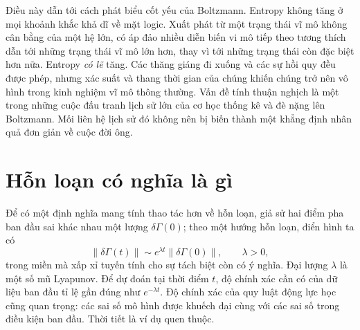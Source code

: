 \begin{classroomqa}
\end{classroomqa}

\begin{classroomqa}
\end{classroomqa}

Điều này dẫn tới cách phát biểu cốt yếu của Boltzmann. Entropy không tăng ở mọi khoảnh khắc khả dĩ về mặt logic. Xuất phát từ một trạng thái vĩ mô không cân bằng của một hệ lớn, có áp đảo nhiều diễn biến vi mô tiếp theo tương thích dẫn tới những trạng thái vĩ mô lớn hơn, thay vì tới những trạng thái còn đặc biệt hơn nữa. Entropy \emph{có lẽ} tăng. Các thăng giáng đi xuống và các sự hồi quy đều được phép, nhưng xác suất và thang thời gian của chúng khiến chúng trở nên vô hình trong kinh nghiệm vĩ mô thông thường. Vấn đề tính thuận nghịch là một trong những cuộc đấu tranh lịch sử lớn của cơ học thống kê và đè nặng lên Boltzmann. Mối liên hệ lịch sử đó không nên bị biến thành một khẳng định nhân quả đơn giản về cuộc đời ông.

\section{Hỗn loạn có nghĩa là gì}

Để có một định nghĩa mang tính thao tác hơn về hỗn loạn, giả sử hai điểm pha ban đầu sai khác nhau một lượng \(\delta\Gamma(0)\); theo một hướng hỗn loạn, điển hình ta có
\begin{equation}
 \lVert\delta\Gamma(t)\rVert
 \sim e^{\lambda t}\lVert\delta\Gamma(0)\rVert,
 \qquad \lambda>0,
 \label{eq:sm7-lyapunov-growth}
\end{equation}
trong miền mà xấp xỉ tuyến tính cho sự tách biệt còn có ý nghĩa. Đại lượng \(\lambda\) là một số mũ Lyapunov. Để dự đoán tại thời điểm \(t\), độ chính xác cần có của dữ liệu ban đầu tỉ lệ gần đúng như \(e^{-\lambda t}\). Độ chính xác của quy luật động lực học cũng quan trọng: các sai số mô hình được khuếch đại cùng với các sai số trong điều kiện ban đầu. Thời tiết là ví dụ quen thuộc.

